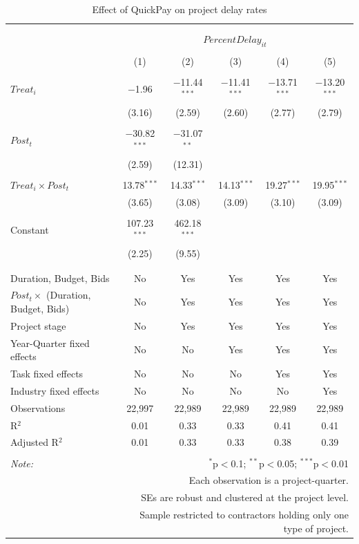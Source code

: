\documentclass[
]{article}
\begin{document}
\begin{table}[H] \centering 
  \caption{Effect of QuickPay on project delay rates} 
  \label{} 
\small 
\begin{tabular}{@{\extracolsep{-2pt}}lccccc} 
\\[-1.8ex]\hline 
\hline \\[-1.8ex] 
\\[-1.8ex] & \multicolumn{5}{c}{$PercentDelay_{it}$} \\ 
\\[-1.8ex] & (1) & (2) & (3) & (4) & (5)\\ 
\hline \\[-1.8ex] 
 $Treat_i$ & $-$1.96 & $-$11.44$^{***}$ & $-$11.41$^{***}$ & $-$13.71$^{***}$ & $-$13.20$^{***}$ \\ 
  & (3.16) & (2.59) & (2.60) & (2.77) & (2.79) \\ 
  & & & & & \\ 
 $Post_t$ & $-$30.82$^{***}$ & $-$31.07$^{**}$ &  &  &  \\ 
  & (2.59) & (12.31) &  &  &  \\ 
  & & & & & \\ 
 $Treat_i \times Post_t$ & 13.78$^{***}$ & 14.33$^{***}$ & 14.13$^{***}$ & 19.27$^{***}$ & 19.95$^{***}$ \\ 
  & (3.65) & (3.08) & (3.09) & (3.10) & (3.09) \\ 
  & & & & & \\ 
 Constant & 107.23$^{***}$ & 462.18$^{***}$ &  &  &  \\ 
  & (2.25) & (9.55) &  &  &  \\ 
  & & & & & \\ 
\hline \\[-1.8ex] 
Duration, Budget, Bids & No & Yes & Yes & Yes & Yes \\ 
$Post_t \times$  (Duration, Budget, Bids) & No & Yes & Yes & Yes & Yes \\ 
Project stage & No & Yes & Yes & Yes & Yes \\ 
Year-Quarter fixed effects & No & No & Yes & Yes & Yes \\ 
Task fixed effects & No & No & No & Yes & Yes \\ 
Industry fixed effects & No & No & No & No & Yes \\ 
Observations & 22,997 & 22,989 & 22,989 & 22,989 & 22,989 \\ 
R$^{2}$ & 0.01 & 0.33 & 0.33 & 0.41 & 0.41 \\ 
Adjusted R$^{2}$ & 0.01 & 0.33 & 0.33 & 0.38 & 0.39 \\ 
\hline 
\hline \\[-1.8ex] 
\textit{Note:}  & \multicolumn{5}{r}{$^{*}$p$<$0.1; $^{**}$p$<$0.05; $^{***}$p$<$0.01} \\ 
 & \multicolumn{5}{r}{Each observation is a project-quarter.} \\ 
 & \multicolumn{5}{r}{SEs are robust and clustered at the project level.} \\ 
 & \multicolumn{5}{r}{Sample restricted to contractors holding only one type of project.} \\ 
\end{tabular} 
\end{table}
\end{document}
